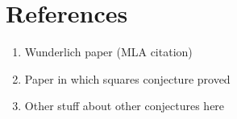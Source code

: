 \documentclass[11pt]{article}
\begin{document}
\section{References}

\begin{enumerate}
\item Wunderlich paper (MLA citation)

\item Paper in which squares conjecture proved

\item Other stuff about other conjectures here
\end{enumerate}
\end{document}
